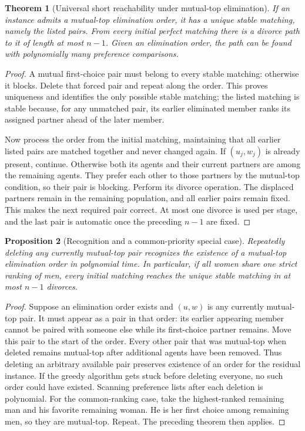 \documentclass[11pt,a4paper]{article}
\newtheorem{theorem}{Theorem}
\newtheorem{proposition}[theorem]{Proposition}
\begin{document}
\begin{theorem}[Universal short reachability under mutual-top elimination]
If an instance admits a mutual-top elimination order, it has a unique stable matching, namely the listed pairs. From every initial perfect matching there is a divorce path to it of length at most $n-1$. Given an elimination order, the path can be found with polynomially many preference comparisons.
\end{theorem}
\begin{proof}
A mutual first-choice pair must belong to every stable matching: otherwise it blocks. Delete that forced pair and repeat along the order. This proves uniqueness and identifies the only possible stable matching; the listed matching is stable because, for any unmatched pair, its earlier eliminated member ranks its assigned partner ahead of the later member.

Now process the order from the initial matching, maintaining that all earlier listed pairs are matched together and never changed again. If $(u_j,w_j)$ is already present, continue. Otherwise both its agents and their current partners are among the remaining agents. They prefer each other to those partners by the mutual-top condition, so their pair is blocking. Perform its divorce operation. The displaced partners remain in the remaining population, and all earlier pairs remain fixed. This makes the next required pair correct. At most one divorce is used per stage, and the last pair is automatic once the preceding $n-1$ are fixed.
\end{proof}

\begin{proposition}[Recognition and a common-priority special case]
Repeatedly deleting any currently mutual-top pair recognizes the existence of a mutual-top elimination order in polynomial time. In particular, if all women share one strict ranking of men, every initial matching reaches the unique stable matching in at most $n-1$ divorces.
\end{proposition}
\begin{proof}
Suppose an elimination order exists and $(u,w)$ is any currently mutual-top pair. It must appear as a pair in that order: its earlier appearing member cannot be paired with someone else while its first-choice partner remains. Move this pair to the start of the order. Every other pair that was mutual-top when deleted remains mutual-top after additional agents have been removed. Thus deleting an arbitrary available pair preserves existence of an order for the residual instance. If the greedy algorithm gets stuck before deleting everyone, no such order could have existed. Scanning preference lists after each deletion is polynomial.
For the common-ranking case, take the highest-ranked remaining man and his favorite remaining woman. He is her first choice among remaining men, so they are mutual-top. Repeat. The preceding theorem then applies.
\end{proof}
\end{document}
